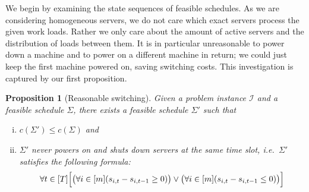 \documentclass[hidelinks]{article}
\theoremstyle{plain}
\newtheorem{prop}[thm]{Proposition}
\theoremstyle{definition}
\theoremstyle{rem}
\newcommand{\inp}{\mathcal{I}}
\newcommand{\costs}{c}
\begin{document}
We begin by examining the state sequences of feasible schedules. As we are considering homogeneous servers, we do not care which exact servers process the given work loads. Rather we only care about the amount of active servers and the distribution of loads between them. It is in particular unreasonable to power down a machine and to power on a different machine in return; we could just keep the first machine powered on, saving switching costs.
This investigation is captured by our first proposition.
\begin{prop}[Reasonable switching]\label{prop_reasonable_switching}
Given a problem instance $\inp$ and a feasible schedule $\Sigma$, there exists a feasible schedule $\Sigma'$ such that 
\begin{enumerate}[(i)]
		\item $\costs(\Sigma')\le \costs(\Sigma)$ and 
		\item $\Sigma'$ never powers on and shuts down servers at the same time slot, i.e.\ $\Sigma'$ satisfies the following formula:
\begin{equation}
	\forall t\in[T]\Bigl[\bigl(\forall i\in[m](s_{i,t}-s_{i,t-1}\ge0)\bigr)\lor\bigl(\forall i\in[m](s_{i,t}-s_{i,t-1}\le 0)\bigr)\Bigr]\label{eq_reasonable_switching}
\end{equation}
\end{enumerate}
\end{prop}
\end{document}

